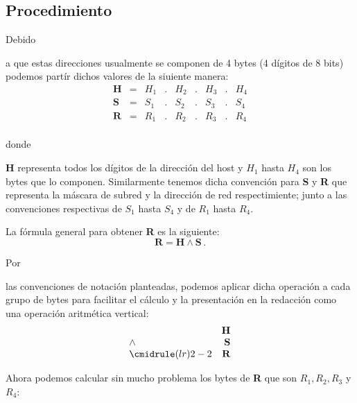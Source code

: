 \documentclass[stu, 12pt, letterpaper, donotrepeattitle, floatsintext, natbib]{apa7}
\begin{document}
\subsection*{Procedimiento}
Debido \begin{justifying}
    a que estas direcciones usualmente se componen de 4 bytes (4 dígitos de 8 bits) podemos partír dichos valores de la siuiente manera:
    \[ \begin{matrix}
        \textbf{H} & = & H_1&.&H_2&.&H_3&.&H_4 \\
        \textbf{S} & = & S_1&.&S_2&.&S_3&.&S_4 \\
        \textbf{R} & = & R_1&.&R_2&.&R_3&.&R_4 \\
        \end{matrix}  \]\par
\end{justifying}
donde \begin{justifying}
    \textbf{H} representa todos los dígitos de la dirección del host y $H_1$ hasta $H_4$ son los bytes que lo componen.
Similarmente tenemos dicha convención para \textbf{S} y \textbf{R} que representa la máscara de subred y la dirección de red respectimiente;
junto a las convenciones respectivas de $S_1$ hasta $S_4$ y de $R_1$ hasta $R_4$.\par
    \end{justifying}
    \vspace{\baselineskip}
La fórmula general para obtener \textbf{R} es la siguiente:
\[\textbf{R}=\textbf{H}\land\textbf{S}\, .\]\par 
Por \begin{justifying}
    las convenciones de notación planteadas, podemos aplicar dicha operación a cada grupo de bytes para facilitar el cálculo y 
la presentación en la redacción como una operación aritmética vertical:
\[
\begin{array}{lr}
   & \textbf{H}  \\
\land  & \textbf{S} \\
\cmidrule(lr){2-2}
  & \textbf{R}  \\
\end{array}
\]
\end{justifying}\par
\vspace{\baselineskip}
Ahora podemos calcular sin mucho problema los bytes de \textbf{R} que son $R_1, R_2, R_3$ y $R_4$:
\end{document}
